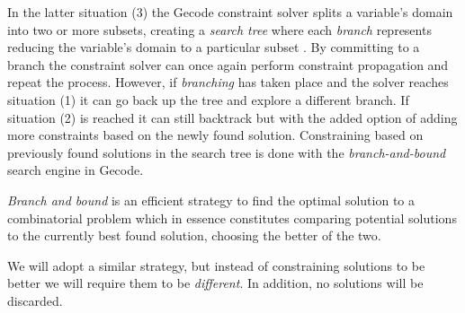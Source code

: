 In the latter situation (3) the Gecode constraint solver splits a variable's domain into
two or more subsets, creating a \textit{search tree} where each \textit{branch} represents
reducing the variable's domain to a particular subset \cite[Section~8]{MPG}. By committing
to a branch the constraint solver can once again perform constraint propagation and repeat
the process. However, if \textit{branching} has taken place and the solver reaches
situation (1) it can go back up the tree and explore a different branch. If situation (2)
is reached it can still backtrack but with the added option of adding more constraints
based on the newly found solution. Constraining based on previously found solutions in the
search tree is done with the \textit{branch-and-bound} search engine\cite[Section~9]{MPG}
in Gecode.

\textit{Branch and bound} is an efficient strategy to find the optimal solution to a
combinatorial problem which in essence constitutes comparing potential solutions to the
currently best found solution, choosing the better of the two\cite{BaB}.

We will adopt a similar strategy, but instead of constraining solutions to be better we
will require them to be \textit{different}. In addition, no solutions will be discarded.
